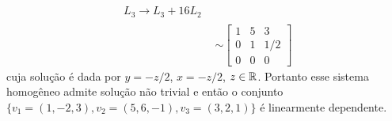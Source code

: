 \begin{exemplos}
\begin{enumerate}
\begin{align*}
        \begin{array}{l}
          \phantom{x}\\\phantom{x}\\L_3 \to L_3 + 16L_2
        \end{array}\\&\sim
        \begin{bmatrix}
          1 & 5 & 3\\
          0 & 1 & 1/2\\
          0 & 0 & 0
        \end{bmatrix}
      \end{align*}
      cuja solução é dada por $y = -z/2$, $x =-z/2$, $z \in \mathbb{R}$. Portanto esse
      sistema homogêneo admite solução não trivial e então o conjunto
      $\{v_1 = (1, -2, 3), v_2 = (5, 6, -1), v_3 = (3, 2, 1)\}$ é linearmente dependente.


\end{enumerate}
\end{exemplos}
